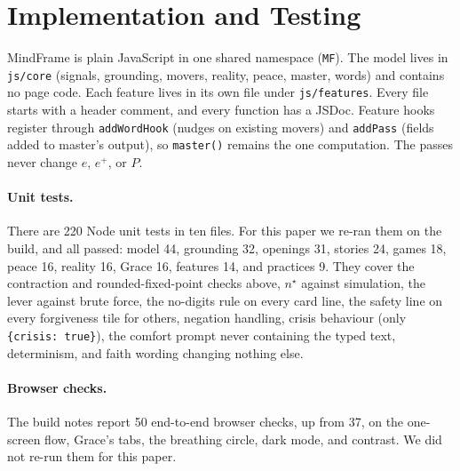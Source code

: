 \documentclass[10pt]{article}
\theoremstyle{definition}
\theoremstyle{remark}
\begin{document}
\section{Implementation and Testing}
\label{sec:testing}
MindFrame is plain JavaScript in one shared namespace (\texttt{MF}). The model lives in \texttt{js/core} (signals, grounding, movers, reality, peace, master, words) and contains no page code. Each feature lives in its own file under \texttt{js/features}. Every file starts with a header comment, and every function has a JSDoc. Feature hooks register through \texttt{addWordHook} (nudges on existing movers) and \texttt{addPass} (fields added to master's output), so \texttt{master()} remains the one computation. The passes never change $e$, $e^{+}$, or $P$.

\paragraph{Unit tests.} There are 220 Node unit tests in ten files. For this paper we re-ran them on the build, and all passed: model 44, grounding 32, openings 31, stories 24, games 18, peace 16, reality 16, Grace 16, features 14, and practices 9. They cover the contraction and rounded-fixed-point checks above, $n^\star$ against simulation, the lever against brute force, the no-digits rule on every card line, the safety line on every forgiveness tile for others, negation handling, crisis behaviour (only \texttt{\{crisis: true\}}), the comfort prompt never containing the typed text, determinism, and faith wording changing nothing else.

\paragraph{Browser checks.} The build notes report 50 end-to-end browser checks, up from 37, on the one-screen flow, Grace's tabs, the breathing circle, dark mode, and contrast. We did not re-run them for this paper.

\end{document}
